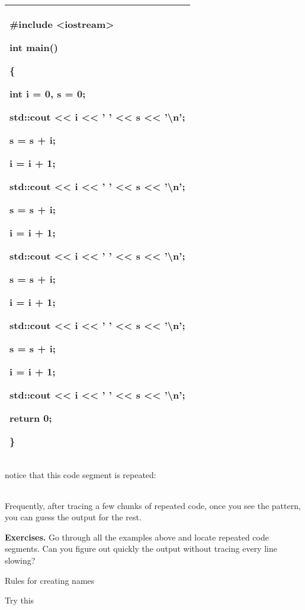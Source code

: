 \documentclass[
]{article}
\begin{document}
\begin{longtable}[]{@{}l@{}}
\toprule
\endhead
\begin{minipage}[t]{0.97\columnwidth}\raggedright
\#include \textless iostream\textgreater{}

int main()

\{

int i = 0, s = 0;

std::cout \textless\textless{} i \textless\textless{} ' '
\textless\textless{} s \textless\textless{} '\textbackslash n';

s = s + i;

i = i + 1;

std::cout \textless\textless{} i \textless\textless{} ' '
\textless\textless{} s \textless\textless{} '\textbackslash n';

s = s + i;

i = i + 1;

std::cout \textless\textless{} i \textless\textless{} ' '
\textless\textless{} s \textless\textless{} '\textbackslash n';

s = s + i;

i = i + 1;

std::cout \textless\textless{} i \textless\textless{} ' '
\textless\textless{} s \textless\textless{} '\textbackslash n';

s = s + i;

i = i + 1;

std::cout \textless\textless{} i \textless\textless{} ' '
\textless\textless{} s \textless\textless{} '\textbackslash n';

return 0;

\}\strut
\end{minipage}\tabularnewline
\bottomrule
\end{longtable}

notice that this code segment is repeated:

\begin{longtable}[]{@{}@{}}
\toprule
\endhead
\bottomrule
\end{longtable}

Frequently, after tracing a few chunks of repeated code, once you see
the pattern, you can guess the output for the rest.

\textbf{Exercises.} Go through all the examples above and locate
repeated code segments. Can you figure out quickly the output without
tracing every line slowing?

Rules for creating names

Try this
\end{document}
